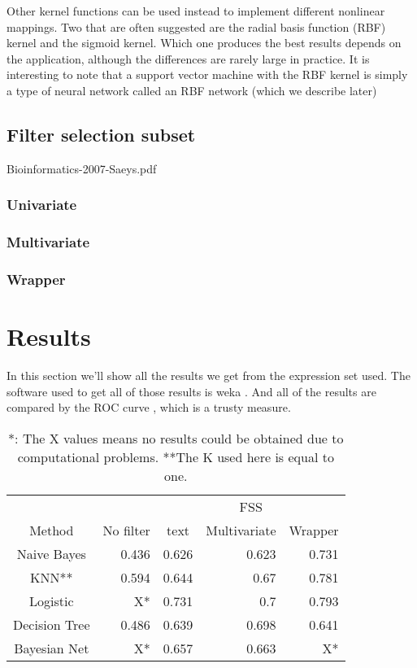 \documentclass[conference,a4paper]{IEEEtran}
\begin{document}
Other kernel functions can be used instead to implement different nonlinear mappings. Two that are often suggested are the radial basis function (RBF) kernel and the sigmoid kernel. Which one produces the best results depends on the application, although the differences are rarely large in practice. It is interesting to note that a support vector machine with the RBF kernel is simply a type of neural network called an RBF network (which we describe later)

\subsection{Filter selection subset}

Bioinformatics-2007-Saeys.pdf

\subsubsection{Univariate}

\subsubsection{Multivariate}

\subsubsection{Wrapper}

\section{Results}


In this section we'll show all the results we get from the expression set used. The software used to get all of those results is weka \cite{weka}. And all of the results are compared by the ROC curve \cite{ROC}, which is a trusty measure.

\begin{table}[h]
\caption{*: The X values means no results could be obtained due to computational problems. **The K used here is equal to one.}
\centering
\begin{tabular}{c r r r r}
\hline\hline
 & & \multicolumn{3}{|c}{FSS} \\
Method & No filter & \multicolumn{1}{|c}{text}Univariate & Multivariate & Wrapper\\ [0.2ex]
\hline
Naive Bayes & 0.436 & 0.626 & 0.623 & 0.731 \\
KNN** & 0.594 & 0.644 & 0.67 & 0.781 \\
Logistic &  X* & 0.731 & 0.7 & 0.793\\
Decision Tree & 0.486 & 0.639 & 0.698 & 0.641\\
Bayesian Net & X* & 0.657 & 0.663 & X* \\ [1ex]
\hline
\end{tabular}
\label{table:basicsResults}
\end{table}
\end{document}
